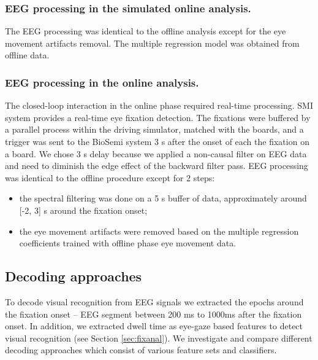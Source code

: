 \documentclass[12pt]{iopart}
\begin{document}
\subsubsection*{EEG processing in the simulated online analysis.}
The EEG processing was identical to the offline analysis
except for the eye movement artifacts removal.
The multiple regression model was obtained from offline data.

\subsubsection*{EEG processing in the online analysis.}
The closed-loop interaction in the online phase required real-time processing.
SMI system provides
a real-time eye fixation detection. The fixations were buffered
by a parallel process within the driving simulator, matched with the boards,
and a trigger was sent to the BioSemi system 3 s after the onset of each the fixation
on a board. We chose 3 s delay because we applied a non-causal filter on EEG data
and need to diminish the edge effect of the backward filter pass.
EEG processing  was identical to the offline procedure
except for 2 steps:
\begin{itemize}
    \item the spectral filtering was done on a 5 s buffer of data,
        approximately around [-2, 3] s around the fixation onset;
    \item the eye movement artifacts were removed based on the multiple
        regression coefficients trained with offline phase eye movement data.
\end{itemize}

\subsection{Decoding approaches}
To decode visual recognition from EEG signals we extracted the epochs
around the fixation onset -- EEG segment between
200 ms to 1000ms  after the fixation onset.
In addition, we extracted dwell time as eye-gaze based features to detect
visual recognition (see Section \ref{sec:fixanal}).
We investigate and compare different decoding approaches which consist of 
various feature sets and classifiers.
\end{document}
